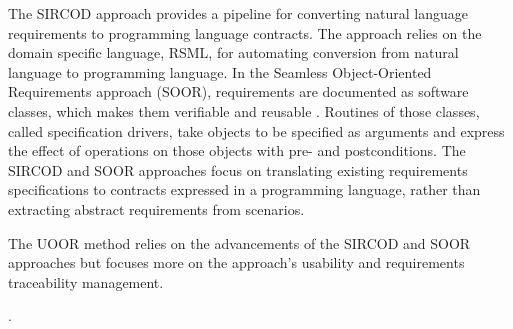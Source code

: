 The SIRCOD approach \cite{galinier2021seamless} provides a pipeline for converting natural language requirements to programming language contracts. The approach relies on the domain specific language, RSML, for automating conversion from natural language to programming language. In the Seamless Object-Oriented Requirements approach (SOOR), requirements are documented as software classes, which makes them verifiable and reusable \cite{39}. Routines of those classes, called specification drivers, take objects to be specified as arguments and express the effect of operations on those objects with pre- and postconditions. The SIRCOD and SOOR approaches focus on translating existing requirements specifications to contracts expressed in a programming language, rather than extracting abstract requirements from scenarios.

The UOOR method relies on the advancements of the SIRCOD and SOOR approaches but focuses more on the approach's usability and requirements traceability management. 

\begingroup
\setlength\tabcolsep{0.08cm}.

